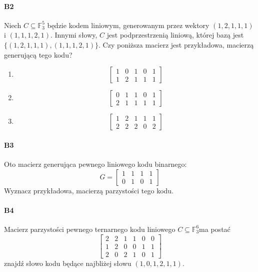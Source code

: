 \paragraph{B2} Niech $C\subseteq \mathbb{F}_3^5$ będzie kodem liniowym, generowanym przez wektory $(1,2,1,1,1)$ i $(1,1,1,2,1)$. Innymi słowy, $C$ jest podprzestrzenią liniową, której bazą jest $\{(1, 2, 1, 1, 1),(1, 1, 1, 2, 1)\}$. Czy poniższa macierz jest przykładowa, macierzą generującą tego kodu?
\begin{enumerate}[label=\alph*)]
\item $$\begin{bmatrix}
1& 0& 1& 0& 1\\
1& 2& 1& 1& 1 
\end{bmatrix}$$
\item  $$\begin{bmatrix}
0& 1& 1& 0& 1\\
2& 1& 1& 1& 1 
\end{bmatrix}$$
\item $$\begin{bmatrix}
1& 2& 1& 1& 1\\
2& 2& 2& 0& 2 
\end{bmatrix}$$
\end{enumerate}


\paragraph{B3} Oto macierz generująca pewnego liniowego kodu binarnego:
$$G =
\begin{bmatrix}
1& 1& 1& 1\\
0& 1& 0& 1 
\end{bmatrix}$$
Wyznacz przykładowa, macierzą parzystości tego kodu.

\paragraph{B4} Macierz parzystości pewnego ternarnego kodu liniowego $C\subseteq \mathbb{F}_3^6$ma postać
$$\begin{bmatrix}
2& 2& 1& 1& 0& 0\\
1& 2& 0& 0& 1& 1\\
2& 0& 2& 1& 0& 1
\end{bmatrix}$$
znajdź słowo kodu będące najbliżej słowu $(1, 0, 1, 2, 1, 1)$.

